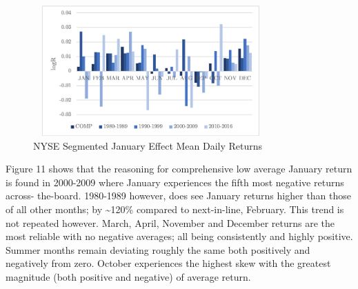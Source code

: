 \documentclass[11pt, english]{article}
\begin{document}
	\begin{figure}[H]
        \begin{center}
                \includegraphics[width=9cm,height=5cm]{NYSE-JE2.png}
                \caption{NYSE Segmented January Effect Mean Daily Returns}     
        \end{center}
        \end{figure}

	Figure 11 shows that the reasoning for comprehensive low average January return is found in 2000-2009 where January experiences the fifth most negative returns across- the-board. 1980-1989 however, does see January returns higher than those of all other months; by \~{}120\% compared to next-in-line, February. This trend is not repeated however. March, April, November and December returns are the most reliable with no negative averages; all being consistently and highly positive. Summer months remain deviating roughly the same both positively and negatively from zero. October experiences the highest skew with the greatest magnitude (both positive and negative) of average return.
\end{document}
